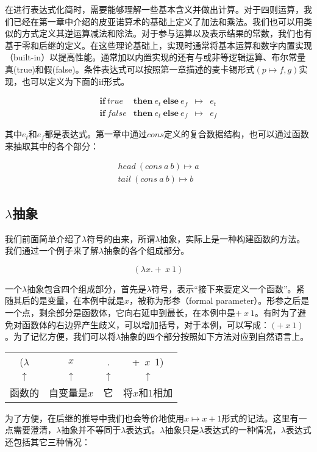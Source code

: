 \documentclass[UTF8]{article}
\begin{document}
在进行表达式化简时，需要能够理解一些基本含义并做出计算。对于四则运算，我们已经在第一章中介绍的皮亚诺算术的基础上定义了加法和乘法。我们也可以用类似的方式定义其逆运算减法和除法。对于参与运算以及表示结果的常数，我们也有基于零和后继的定义。在这些理论基础上，实现时通常将基本运算和数字内置实现（built-in）以提高性能。通常加以内置实现的还有与或非等逻辑运算、布尔常量真(true)和假(false)。条件表达式可以按照第一章描述的麦卡锡形式$(p \mapsto f, g)$实现，也可以定义为下面的if形式。

\[
\begin{array}{llcl}
\textbf{if}\ true\! & \textbf{then}\ e_t\ \textbf{else}\ e_f & \mapsto & e_t \\
\textbf{if}\ false\! & \textbf{then}\ e_t\ \textbf{else}\ e_f & \mapsto & e_f
\end{array}
\]

其中$e_t$和$e_f$都是表达式。第一章中通过$cons$定义的复合数据结构，也可以通过函数来抽取其中的各个部分：

\[
\begin{array}{l}
head\ (cons\ a\ b) \mapsto a \\
tail\ (cons\ a\ b) \mapsto b
\end{array}
\]

\subsection{$\lambda$抽象}
我们前面简单介绍了$\lambda$符号的由来，所谓$\lambda$抽象，实际上是一种构建函数的方法。我们通过一个例子来了解$\lambda$抽象的各个组成部分。

\[
(\lambda x . +\ x\ 1)
\]

一个$\lambda$抽象包含四个组成部分，首先是$\lambda$符号，表示“接下来要定义一个函数”。紧随其后的是变量，在本例中就是$x$，被称为形参（formal parameter）。形参之后是一个点，剩余部分是函数体，它向右延申到最长，在本例中是$+\ x\ 1$。有时为了避免对函数体的右边界产生歧义，可以增加括号，对于本例，可以写成：$(+\ x\ 1)$。为了记忆方便，我们可以将$\lambda$抽象的四个部分按照如下方法对应到自然语言上。

\begin{tabular}{cccc}
($\lambda$ & $x$ & . & +\  $x$\ 1) \\
$\uparrow$ & $\uparrow$ & $\uparrow$ & $\uparrow$ \\
函数的 & 自变量是$x$ & 它 & 将$x$和1相加 \\
\end{tabular}

为了方便，在后继的推导中我们也会等价地使用$x \mapsto x + 1$形式的记法。这里有一点需要澄清，$\lambda$抽象并不等同于$\lambda$表达式。$\lambda$抽象只是$\lambda$表达式的一种情况，$\lambda$表达式还包括其它三种情况：
\end{document}
